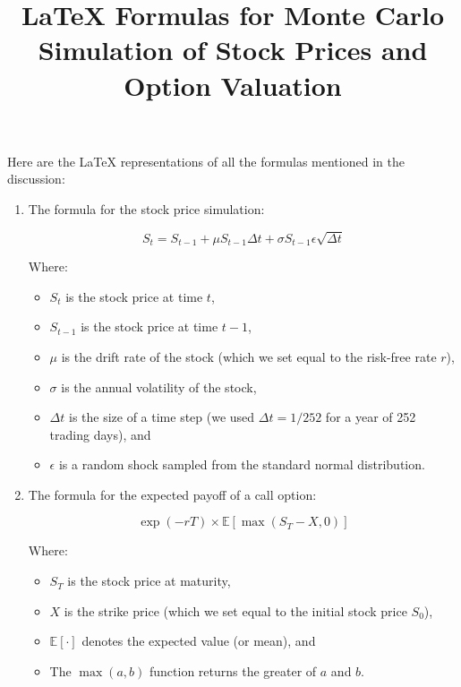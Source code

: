 \documentclass{article}
\begin{document}
\title{LaTeX Formulas for Monte Carlo Simulation of Stock Prices and Option Valuation}
\maketitle

Here are the LaTeX representations of all the formulas mentioned in the discussion:

\begin{enumerate}
\item The formula for the stock price simulation:

\begin{equation*}
S_t = S_{t-1} + \mu S_{t-1}\Delta t + \sigma S_{t-1}\epsilon \sqrt{\Delta t}
\end{equation*}

Where:
\begin{itemize}
\item \(S_t\) is the stock price at time \(t\),
\item \(S_{t-1}\) is the stock price at time \(t-1\),
\item \(\mu\) is the drift rate of the stock (which we set equal to the risk-free rate \(r\)),
\item \(\sigma\) is the annual volatility of the stock,
\item \(\Delta t\) is the size of a time step (we used \(\Delta t = 1/252\) for a year of 252 trading days), and
\item \(\epsilon\) is a random shock sampled from the standard normal distribution.
\end{itemize}

\item The formula for the expected payoff of a call option:

\begin{equation*}
\exp(-rT) \times \mathbb{E}[\max(S_T - X, 0)]
\end{equation*}

Where:
\begin{itemize}
\item \(S_T\) is the stock price at maturity,
\item \(X\) is the strike price (which we set equal to the initial stock price \(S_0\)),
\item \(\mathbb{E}[\cdot]\) denotes the expected value (or mean), and
\item The \(\max(a, b)\) function returns the greater of \(a\) and \(b\).
\end{itemize}


\end{enumerate}
\end{document}
